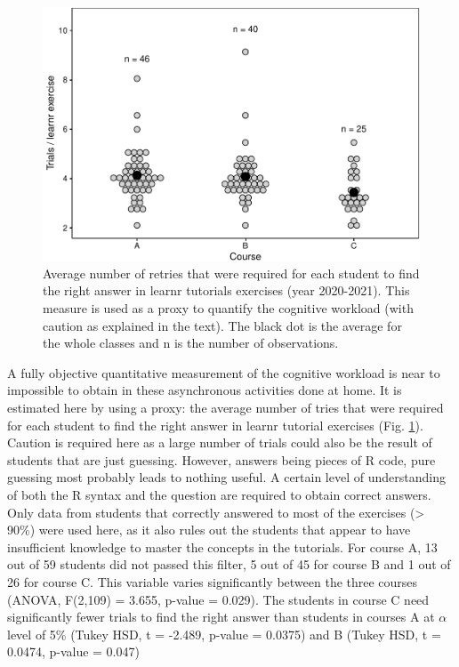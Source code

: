 \documentclass{aims}
\theoremstyle{definition}
\begin{document}
\begin{figure}
\includegraphics[width=1\linewidth]{teaching_data_science_files/figure-latex/fig_learn_trials-1} \caption{\label{fig:fig_learn_trials} Average number of retries that were required for each student to find the right answer in learnr tutorials exercises (year 2020-2021). This measure is used as a proxy to quantify the cognitive workload (with caution as explained in the text). The black dot is the average for the whole classes and n is the number of observations.}\label{fig:fig_learn_trials}
\end{figure}

A fully objective quantitative measurement of the cognitive workload is
near to impossible to obtain in these asynchronous activities done at
home. It is estimated here by using a proxy: the average number of tries
that were required for each student to find the right answer in learnr
tutorial exercises (Fig. \ref {fig:fig_learn_trials}). Caution is
required here as a large number of trials could also be the result of
students that are just guessing. However, answers being pieces of R
code, pure guessing most probably leads to nothing useful. A certain
level of understanding of both the R syntax and the question are
required to obtain correct answers. Only data from students that
correctly answered to most of the exercises (\textgreater{} 90\%) were
used here, as it also rules out the students that appear to have
insufficient knowledge to master the concepts in the tutorials. For
course A, 13 out of 59 students did not passed this filter, 5 out of 45
for course B and 1 out of 26 for course C. This variable varies
significantly between the three courses (ANOVA, F(2,109) = 3.655,
p-value = 0.029). The students in course C need significantly fewer
trials to find the right answer than students in courses A at \(\alpha\)
level of 5\% (Tukey HSD, t = -2.489, p-value = 0.0375) and B (Tukey HSD,
t = 0.0474, p-value = 0.047)
\end{document}
